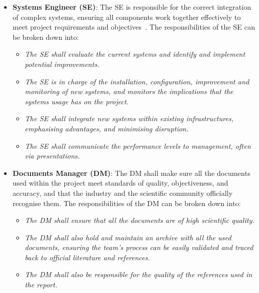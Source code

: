 \begin{itemize}
    \item \textbf{Systems Engineer (SE)}: The SE is responsible for the correct integration of complex systems, ensuring all components work together effectively to meet project requirements and objectives~\cite{SysEngrespons}.
    The responsibilities of the SE can be broken down into:
    \begin{itemize}
        \item \textit{The SE shall evaluate the current systems and identify and implement potential improvements.}
        \item \textit{The SE is in charge of the installation, configuration, improvement and monitoring of new systems, and monitors the implications that the systems usage has on the project.}
        \item \textit{The SE shall integrate new systems within existing infrastructures, emphasising advantages, and minimising disruption.}
        \item \textit{The SE shall communicate the performance levels to management, often via presentations.}
    \end{itemize}
    \item \textbf{Documents Manager (DM)}: The DM shall make sure all the documents used within the project meet standards of quality, objectiveness, and accuracy, and that the industry and the scientific community officially recognise them.
    The responsibilities of the DM can be broken down into:
    \begin{itemize}
        \item \textit{The DM shall ensure that all the documents are of high scientific quality.}
        \item \textit{The DM shall also hold and maintain an archive with all the used documents, ensuring the team's process can be easily validated and traced back to official literature and references.}
        \item \textit{The DM shall also be responsible for the quality of the references used in the report.}
    \end{itemize}

\end{itemize}
